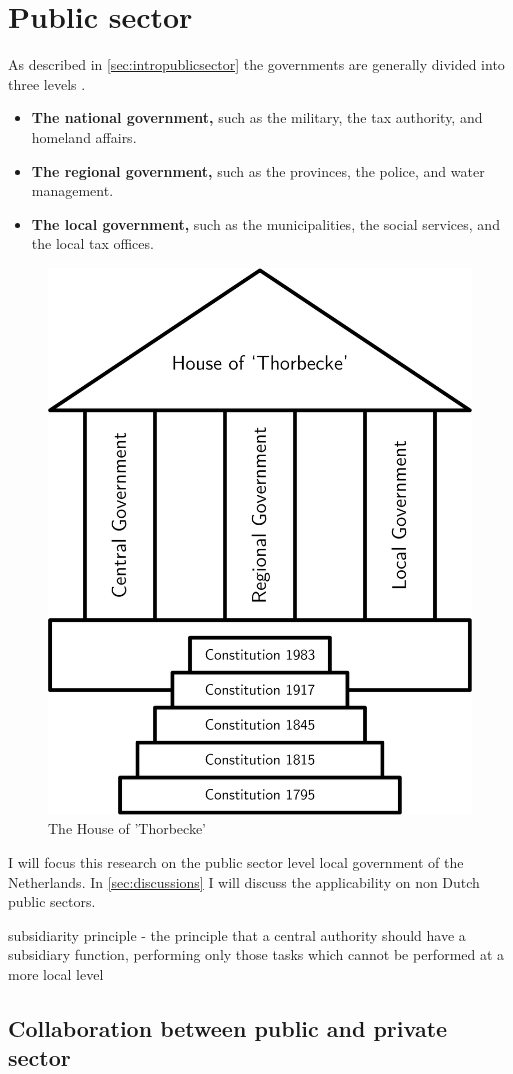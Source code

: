 \section{Public sector}
\label{sec:tbpublicsector}


As described in \cref{sec:intropublicsector}  the governments are generally divided into three levels \parencite{PrivacySense2016}.

\begin{itemize}
	\item{\textbf{The national government,} such as the military, the tax authority, and homeland affairs.}
	\item{\textbf{The regional government,} such as the provinces, the police, and water management.}
	\item{\textbf{The local government,} such as the municipalities, the social services, and the local tax offices.}
\end{itemize}

\begin{figure}[H]
	\centering
	\includegraphics[width=0.4\linewidth]{images/thorbecke}
	\caption[The House of 'Thorbecke']{The House of 'Thorbecke'}
	\label{fig:houseofthorbecke}
\end{figure}



I will focus this research on the public sector level local government of the Netherlands. In \cref{sec:discussions} I will discuss the applicability on non Dutch public sectors.



subsidiarity principle - the principle that a central authority should have a subsidiary function, performing only those tasks which cannot be performed at a more local level


\subsection{Collaboration between public and private sector}

